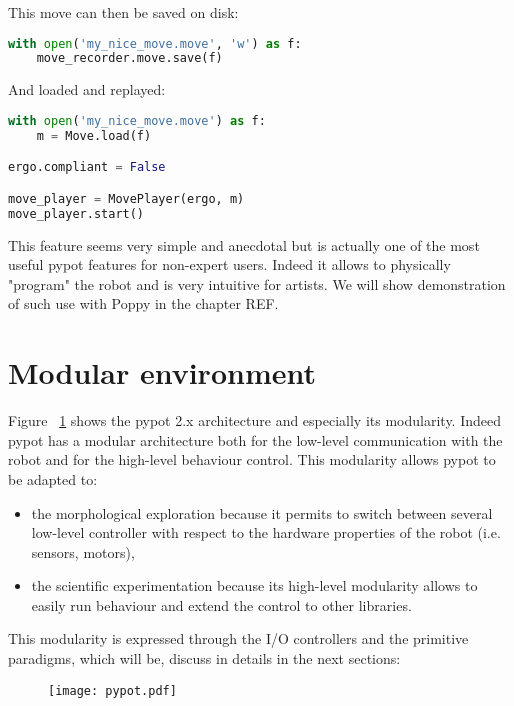 This move can then be saved on disk:
\begin{lstlisting}[language = Python]
with open('my_nice_move.move', 'w') as f:
    move_recorder.move.save(f)
\end{lstlisting}

And loaded and replayed:
\begin{lstlisting}[language = Python]
with open('my_nice_move.move') as f:
    m = Move.load(f)

ergo.compliant = False

move_player = MovePlayer(ergo, m)
move_player.start()
\end{lstlisting}

This feature seems very simple and anecdotal but is actually one of the most useful pypot features for non-expert users. Indeed it allows to physically "program" the robot and is very intuitive for artists. We will show demonstration of such use with Poppy in the chapter REF.



\section{Modular environment} %

Figure \figurename~\ref{fig:pypot-modular-architecture} shows the pypot 2.x architecture and especially its modularity. Indeed pypot has a modular architecture both for the low-level communication with the robot and for the high-level behaviour control. This modularity allows pypot to be adapted to:

\begin{itemize}
    \item the morphological exploration because it permits to switch between several low-level controller with respect to the hardware properties of the robot (i.e. sensors, motors),
    \item the scientific experimentation because its high-level modularity allows to easily run behaviour and extend the control to other libraries.
\end{itemize}

This modularity is expressed through the I/O controllers and the primitive paradigms, which will be, discuss in details in the next sections:


\begin{figure}[p]
    \begin{center}
        \texttt{[image: pypot.pdf]}
    \end{center}
    \caption{}
    \label{fig:pypot-modular-architecture}
\end{figure}


